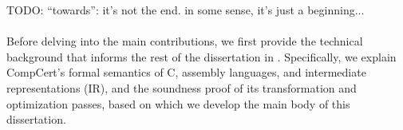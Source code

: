 TODO: ``towards'': it's not the end.  in some sense, it's just a beginning...



\paragraph*{}

Before delving into the main contributions, we first provide the technical background that informs
the rest of the dissertation in .  Specifically, we explain CompCert's formal
semantics of C, assembly languages, and intermediate representations (IR), and the soundness proof
of its transformation and optimization passes, based on which we develop the main body of this
dissertation.


%


